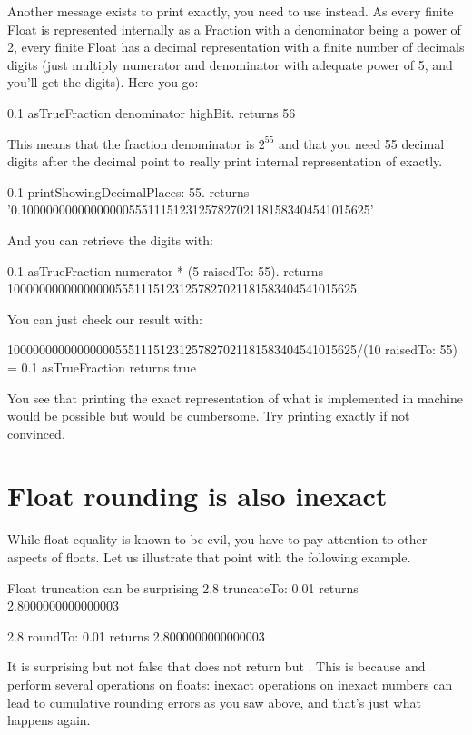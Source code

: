 \documentclass[a4paper,10pt,twoside]{book}
\begin{document}
Another message exists to print exactly, you need to use  instead.
As every finite Float is  represented internally as a Fraction with a
denominator being a power of 2, every finite Float has a decimal
representation with a finite number of decimals digits (just multiply
numerator and denominator with adequate power of 5, and you'll get the
digits). Here you go:
\begin{code}{}
0.1 asTrueFraction denominator highBit.
	returns  56
\end{code}
This means that the fraction denominator is $2^{55}$ and that you need 55 decimal digits after the decimal point to really print internal representation of  exactly.
\begin{code}{}
0.1 printShowingDecimalPlaces: 55.
	returns '0.1000000000000000055511151231257827021181583404541015625'
\end{code}
And you can retrieve the digits with:
\begin{code}{}
0.1 asTrueFraction numerator * (5 raisedTo: 55).
	returns  1000000000000000055511151231257827021181583404541015625
\end{code}
You can just check our result with:
\begin{code}{}
1000000000000000055511151231257827021181583404541015625/(10 raisedTo: 55) =  0.1 asTrueFraction
	returns true
\end{code}
You see that printing the exact representation of what is implemented in machine would be possible but would be cumbersome. Try printing  exactly if not convinced.



\section{Float rounding is also inexact}
While float equality is known to be evil, you have to pay attention to other aspects of floats. Let us illustrate that point with the following example.

\begin{code}{Float truncation can be surprising}
2.8 truncateTo: 0.01
	returns 2.8000000000000003

2.8 roundTo: 0.01
	returns 2.8000000000000003
\end{code}

It is surprising but not false that  does not return  but . This is because  and  perform several operations on floats: inexact operations on inexact numbers can lead to cumulative rounding errors as you saw above, and that's just what happens again.
\end{document}
